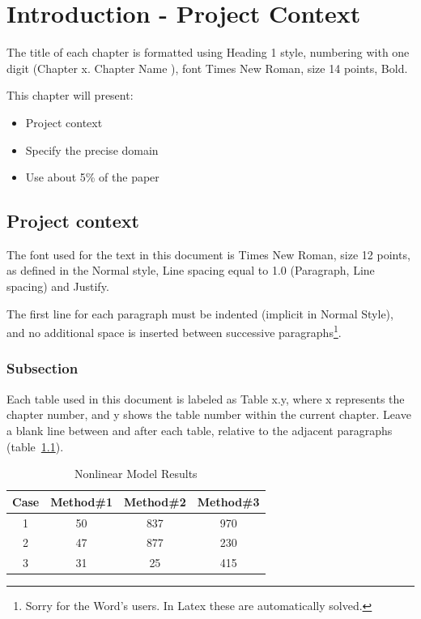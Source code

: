 \documentclass[12pt,a4paper,twoside]{report}
\begin{document}
\newpage

\tableofcontents
\newpage



\chapter{Introduction - Project Context}
\pagestyle{headings}

The title of each chapter is formatted using Heading 1 style, numbering with one digit (Chapter x. Chapter Name ), font Times New Roman, size 14 points, Bold.

This chapter will present:

\begin{itemize}
 \item Project context 
\item Specify the precise domain
\item Use about 5\% of the paper
\end{itemize}


\section{Project context}

The font used for the text in this document is Times New Roman, size 12 points, as defined in the Normal style, Line spacing equal to 1.0 (Paragraph, Line spacing) and Justify. 

The first line for each paragraph must be indented (implicit in Normal Style), and no additional space is inserted between successive paragraphs\footnote{Sorry for the Word's users. In Latex these are automatically solved.}.


\subsection{Subsection}
Each table used in this document is labeled as Table x.y, where x represents the chapter number, and y shows the table number within the current chapter. Leave a blank line between and after each table, relative to the adjacent paragraphs (table~\ref{table:nonlin}).

\begin{table}[ht]
\caption{Nonlinear Model Results}
\centering                          %
\begin{tabular}{|c|c|c|c|}          %
\hline\hline                        %
Case & Method\#1 & Method\#2 & Method\#3 \\ [0.5ex]   %
\hline                              %
1 & 50 & 837 & 970 \\               %
2 & 47 & 877 & 230 \\
3 & 31 & 25 & 415 \\[1ex]           %
\hline                              
\end{tabular}
\label{table:nonlin}                %
\end{table}
\end{document}
